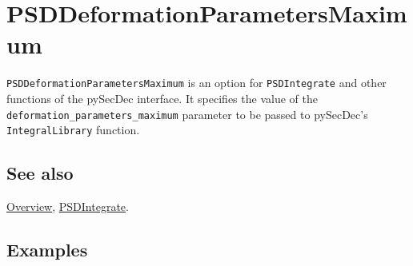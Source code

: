 \documentclass[../FeynHelpersManual.tex]{subfiles}
\begin{document}
\hypertarget{psddeformationparametersmaximum}{
\section{PSDDeformationParametersMaximum}\label{psddeformationparametersmaximum}}

\texttt{PSDDeformationParametersMaximum} is an option for
\texttt{PSDIntegrate} and other functions of the pySecDec interface. It
specifies the value of the \texttt{deformation_parameters_maximum}
parameter to be passed to pySecDec's \texttt{IntegralLibrary} function.

\subsection{See also}

\hyperlink{toc}{Overview}, \hyperlink{psdintegrate}{PSDIntegrate}.

\subsection{Examples}
\end{document}
